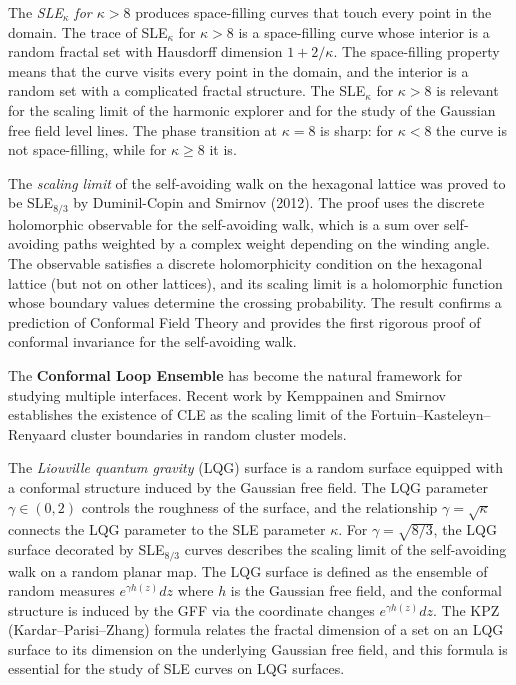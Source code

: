 The \emph{SLE$_\kappa$ for $\kappa > 8$} produces space-filling curves that touch every point in the domain. The trace of SLE$_\kappa$ for $\kappa > 8$ is a space-filling curve whose interior is a random fractal set with Hausdorff dimension $1 + 2/\kappa$. The space-filling property means that the curve visits every point in the domain, and the interior is a random set with a complicated fractal structure. The SLE$_\kappa$ for $\kappa > 8$ is relevant for the scaling limit of the harmonic explorer and for the study of the Gaussian free field level lines. The phase transition at $\kappa = 8$ is sharp: for $\kappa < 8$ the curve is not space-filling, while for $\kappa \ge 8$ it is.

The \emph{scaling limit} of the self-avoiding walk on the hexagonal lattice was proved to be SLE$_{8/3}$ by Duminil-Copin and Smirnov (2012). The proof uses the discrete holomorphic observable for the self-avoiding walk, which is a sum over self-avoiding paths weighted by a complex weight depending on the winding angle. The observable satisfies a discrete holomorphicity condition on the hexagonal lattice (but not on other lattices), and its scaling limit is a holomorphic function whose boundary values determine the crossing probability. The result confirms a prediction of Conformal Field Theory and provides the first rigorous proof of conformal invariance for the self-avoiding walk.

The \textbf{Conformal Loop Ensemble} has become the natural framework for studying multiple interfaces. Recent work by Kemppainen and Smirnov establishes the existence of CLE as the scaling limit of the Fortuin--Kasteleyn--Renyaard cluster boundaries in random cluster models.

The \emph{Liouville quantum gravity} (LQG) surface is a random surface equipped with a conformal structure induced by the Gaussian free field. The LQG parameter $\gamma \in (0,2)$ controls the roughness of the surface, and the relationship $\gamma = \sqrt{\kappa}$ connects the LQG parameter to the SLE parameter $\kappa$. For $\gamma = \sqrt{8/3}$, the LQG surface decorated by SLE$_{8/3}$ curves describes the scaling limit of the self-avoiding walk on a random planar map. The LQG surface is defined as the ensemble of random measures $e^{\gamma h(z)} dz$ where $h$ is the Gaussian free field, and the conformal structure is induced by the GFF via the coordinate changes $e^{\gamma h(z)} dz$. The KPZ (Kardar--Parisi--Zhang) formula relates the fractal dimension of a set on an LQG surface to its dimension on the underlying Gaussian free field, and this formula is essential for the study of SLE curves on LQG surfaces.

